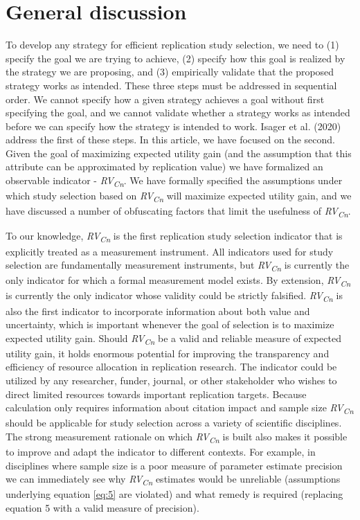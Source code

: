 \documentclass[
  english,
  jou,floatsintext]{apa6}
\begin{document}
\hypertarget{general-discussion}{%
\section{General discussion}\label{general-discussion}}

To develop any strategy for efficient replication study selection, we need to (1) specify the goal we are trying to achieve, (2) specify how this goal is realized by the strategy we are proposing, and (3) empirically validate that the proposed strategy works as intended. These three steps must be addressed in sequential order. We cannot specify how a given strategy achieves a goal without first specifying the goal, and we cannot validate whether a strategy works as intended before we can specify how the strategy is intended to work. Isager et al. (2020) address the first of these steps. In this article, we have focused on the second. Given the goal of maximizing expected utility gain (and the assumption that this attribute can be approximated by replication value) we have formalized an observable indicator - \emph{RV\textsubscript{Cn}}. We have formally specified the assumptions under which study selection based on \emph{RV\textsubscript{Cn}} will maximize expected utility gain, and we have discussed a number of obfuscating factors that limit the usefulness of \emph{RV\textsubscript{Cn}}.

To our knowledge, \emph{RV\textsubscript{Cn}} is the first replication study selection indicator that is explicitly treated as a measurement instrument. All indicators used for study selection are fundamentally measurement instruments, but \emph{RV\textsubscript{Cn}} is currently the only indicator for which a formal measurement model exists. By extension, \emph{RV\textsubscript{Cn}} is currently the only indicator whose validity could be strictly falsified. \emph{RV\textsubscript{Cn}} is also the first indicator to incorporate information about both value and uncertainty, which is important whenever the goal of selection is to maximize expected utility gain. Should \emph{RV\textsubscript{Cn}} be a valid and reliable measure of expected utility gain, it holds enormous potential for improving the transparency and efficiency of resource allocation in replication research. The indicator could be utilized by any researcher, funder, journal, or other stakeholder who wishes to direct limited resources towards important replication targets. Because calculation only requires information about citation impact and sample size \emph{RV\textsubscript{Cn}} should be applicable for study selection across a variety of scientific disciplines. The strong measurement rationale on which \emph{RV\textsubscript{Cn}} is built also makes it possible to improve and adapt the indicator to different contexts. For example, in disciplines where sample size is a poor measure of parameter estimate precision we can immediately see why \emph{RV\textsubscript{Cn}} estimates would be unreliable (assumptions underlying equation \eqref{eq:5} are violated) and what remedy is required (replacing equation 5 with a valid measure of precision).
\end{document}
